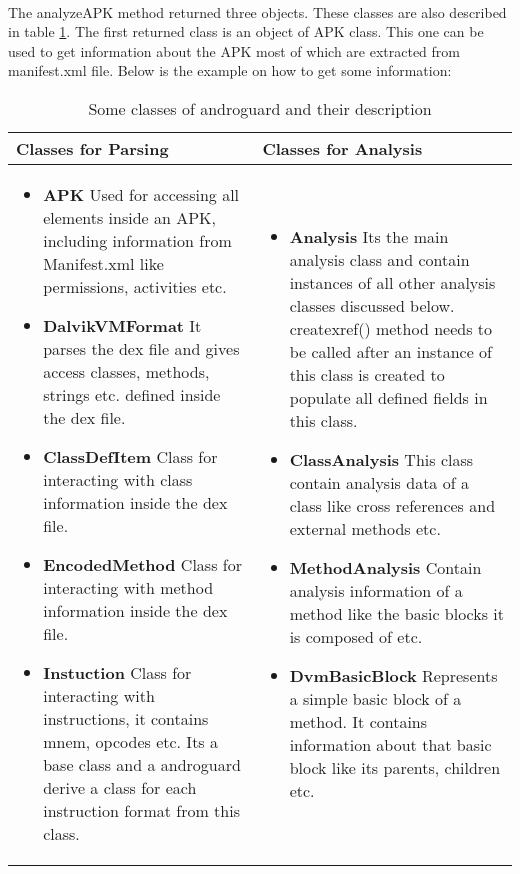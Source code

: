 \documentclass[../main.tex]{subfile}
\begin{document}
			\paragraph{} The analyzeAPK method returned three objects. These classes are also described in table \ref{table:androguard_classes}. The first returned class is an object of APK class. This one can be used to get information about the APK most of which are extracted from manifest.xml file. Below is the example on how to get some information:
			
			\begin{table}
				\begin{center}
					\begin{tabular}{|p{5cm}|p{5cm}|}
						\hline \textbf{Classes for Parsing} & \textbf{Classes for Analysis}\\ \hline
						\begin{itemize}
							\item \textbf{APK} Used for accessing all elements inside an APK, including information from Manifest.xml like permissions, activities etc.
							\item \textbf{DalvikVMFormat}	It parses the dex file and gives access classes, methods, strings etc. defined inside the dex file.
							\item \textbf{ClassDefItem} Class for interacting with class information inside the dex file.
							\item \textbf{EncodedMethod} Class for interacting with method information inside the dex file. 
							\item \textbf{Instuction} Class for interacting with instructions, it contains mnem, opcodes etc. Its a base class and a androguard derive a class for each instruction format from this class.
						\end{itemize}
						
						&
						
						\begin{itemize}
							\item \textbf{Analysis} Its the main analysis class and contain instances of all other analysis classes discussed below. create\textunderscore xref() method needs to be called after an instance of this class is created to populate all defined fields in this class.
							\item \textbf{ClassAnalysis} This class contain analysis data of a class like cross references and external methods etc.
							\item \textbf{MethodAnalysis} Contain analysis information of a method like the basic blocks it is composed of etc.
							\item \textbf{DvmBasicBlock} Represents a simple basic block of a method. It contains information about that basic block like its parents, children etc.
						\end{itemize}\\ \hline
						
					\end{tabular}
				\end{center}
				\caption{Some classes of androguard and their description}
				\label{table:androguard_classes}
			\end{table}
		
\end{document}
